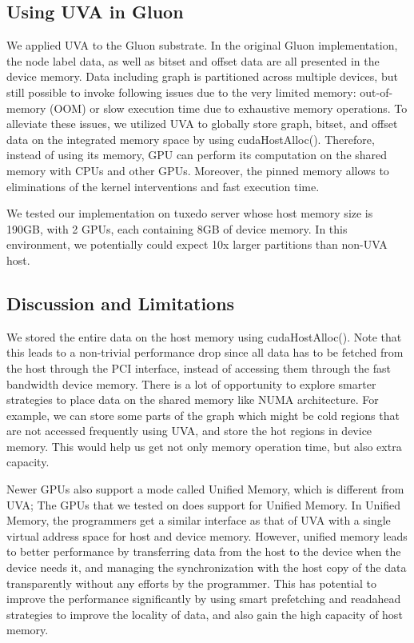 \subsection{Using UVA in Gluon}
We applied UVA to the Gluon substrate. In the original Gluon implementation,
the node label data, as well as bitset and offset data are all presented in the device memory. 
Data including graph is partitioned across multiple devices, but still possible to invoke following issues due to 
the very limited memory: out-of-memory (OOM) or slow execution time due to exhaustive memory operations.
To alleviate these issues,
we utilized UVA to globally store graph, bitset, and offset data on the integrated memory space by using cudaHostAlloc().
Therefore, instead of using its memory, GPU can perform its computation on the shared memory with CPUs and other GPUs.
Moreover, the pinned memory allows to eliminations of the kernel interventions and fast execution time.

We tested our implementation on tuxedo server whose host memory size is 190GB, with 2 GPUs, each containing 8GB of device memory. 
In this environment, we potentially could expect 10x larger partitions than non-UVA host. 

\subsection{Discussion and Limitations}
We stored the entire data on the host memory using cudaHostAlloc(). Note that this leads to a non-trivial performance drop since all data has to be fetched from the host through the PCI interface, instead of accessing them through the fast bandwidth device memory.
There is a lot of opportunity to explore smarter strategies to place data on the shared memory like NUMA architecture.
For example, we can store some parts of the graph which might be cold regions that are not accessed frequently using UVA, and store the hot regions in device memory.
This would help us get not only memory operation time, but also extra capacity.

Newer GPUs also support a mode called Unified Memory, which is different from UVA;
The GPUs that we tested on does support for Unified Memory. 
In Unified Memory, the programmers get a similar interface as that of UVA with a single virtual address space for host and device memory.
However, unified memory leads to better performance by transferring data from the host to the device when the device needs it, and managing the synchronization with the host copy of the data transparently without any efforts by the programmer. This has potential to improve the performance significantly by using smart prefetching and readahead strategies to improve the locality of data, and also gain the high capacity of host memory. 
